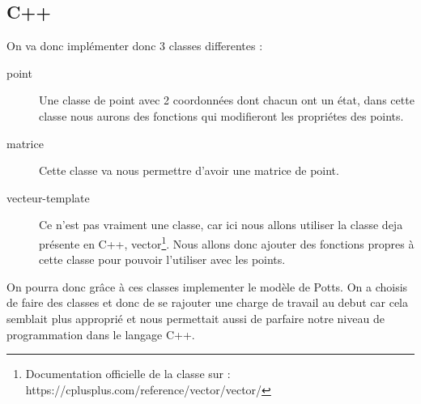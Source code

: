 \begin{article}
    \subsection{C++}
    \noindent On va donc implémenter donc 3 classes differentes :
    \begin{description}
        \item[point] Une classe de point avec 2 coordonnées dont chacun ont un état, dans cette classe nous aurons des fonctions qui modifieront les propriétes des points.
        \item[matrice] Cette classe va nous permettre d'avoir une matrice de point.
        \item[vecteur-template] Ce n'est pas vraiment une classe, car ici nous allons utiliser la classe deja présente en C++, vector\footnote{Documentation officielle de la classe sur : https://cplusplus.com/reference/vector/vector/}.
        Nous allons donc ajouter des fonctions propres à cette classe pour pouvoir l'utiliser avec les points.
    \end{description}
    \newline
    On pourra donc grâce à ces classes implementer le modèle de Potts.
    \newline On a choisis de faire des classes et donc de se rajouter une charge de travail au debut car cela semblait plus approprié et nous permettait aussi de parfaire notre niveau de programmation dans le langage C++.
    \newline
\end{article}